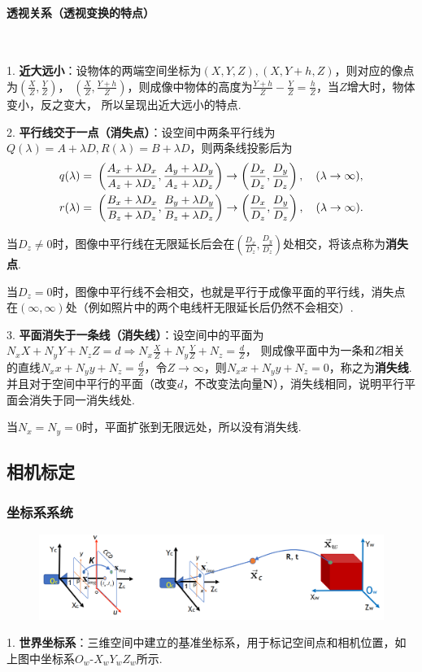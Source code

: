 \documentclass[12pt, a4paper, oneside]{ctexart}
\numberwithin{equation}{section}  %
\theoremstyle{definition}
\def\bd{\boldsymbol}        %
\def\tsty{\textstyle}       %
\def\add{\vspace{1ex}}      %
\begin{document}
\paragraph{透视关系（透视变换的特点）}\ \par
1. \textbf{近大远小}：设物体的两端空间坐标为$(X,Y,Z),(X,Y+h,Z)$，则对应的像点为$\tsty(\frac{X}{Z},\frac{Y}{Z})$，
$\tsty(\frac{X}{Z},\frac{Y+h}{Z})$，则成像中物体的高度为$\tsty \frac{Y+h}{Z}-\frac{Y}{Z}=\frac{h}{Z}$，当$Z$增大时，物体变小，反之变大，
所以呈现出近大远小的特点.

2. \textbf{平行线交于一点（消失点）}：设空间中两条平行线为$Q(\lambda) = A+\lambda D,R(\lambda) = B+\lambda D$，则两条线投影后为
\begin{align*}
    q(\lambda)=&\ \left(\frac{A_x+\lambda D_x}{A_z+\lambda D_z}, \frac{A_y+\lambda D_y}{A_z+\lambda D_z}\right)\to \left(\frac{D_x}{D_z},\frac{D_y}{D_z}\right),\quad(\lambda \to\infty),\add\\
    r(\lambda)=&\ \left(\frac{B_x+\lambda D_x}{B_z+\lambda D_z}, \frac{B_y+\lambda D_y}{B_z+\lambda D_z}\right)\to \left(\frac{D_x}{D_z},\frac{D_y}{D_z}\right),\quad(\lambda \to\infty).
\end{align*}

当$D_z\neq 0$时，图像中平行线在无限延长后会在$\tsty (\frac{D_x}{D_z},\frac{D_y}{D_z})$处相交，将该点称为\textbf{消失点}.

当$D_z = 0$时，图像中平行线不会相交，也就是平行于成像平面的平行线，消失点在$(\infty,\infty)$处（例如照片中的两个电线杆无限延长后仍然不会相交）.

3. \textbf{平面消失于一条线（消失线）}：设空间中的平面为$\tsty N_xX+N_yY+N_zZ = d\Rightarrow N_x\frac{X}{Z}+N_y\frac{Y}{Z}+N_z=\frac{d}{Z}$，
则成像平面中为一条和$Z$相关的直线$\tsty N_xx+N_yy+N_z = \frac{d}{Z}$，令$Z\to\infty$，则$\tsty N_xx+N_yy+N_z = 0$，称之为\textbf{消失线}.
并且对于空间中平行的平面（改变$d$，不改变法向量$\bd{N}$），消失线相同，说明平行平面会消失于同一消失线处.

当$N_x=N_y=0$时，平面扩张到无限远处，所以没有消失线.

\subsection{相机标定}
\subsubsection{坐标系系统}
\begin{figure}[htbp]
    \centering
    \includegraphics[scale=0.55]{坐标系转换.png}
\end{figure}
1. \textbf{世界坐标系}：三维空间中建立的基准坐标系，用于标记空间点和相机位置，如上图中坐标系$O_w\text{-}X_wY_wZ_w$所示.
\end{document}

